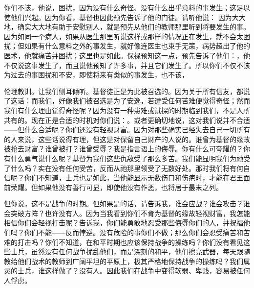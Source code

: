 你们不该，他说，困扰，因为没有什么奇怪、没有什么出乎意料的事发生；这足以使他们兴起。因为你看，基督也因此预先告诉了他的门徒。请听他说： 因为大大地，确实大大地有助于安慰别人，就是预先从他们的教师那里听到将要发生的事。因为如同一个病人，如果从医生那里听说这样或那样的情况正在发生，就不会太困扰；但如果有什么意料之外的事发生，就好像连医生也束手无策，病势超出了他的医术，他就痛苦并困扰；这里也是如此。保禄预知这一点，预先告诉了他们：，他不仅说这事发生了，而且说他预知了许多事，并且它们发生了。所以你们不仅不该为过去的事困扰和不安，即使将来有类似的事发生，也不该，\par

伦理教训。让我们侧耳倾听。基督徒正是为此被召选的。因为关于所有信友，都说了这话：而我们，好像我们被召选是为了安逸，若遭受任何苦难便觉得奇怪；然而我们有什么理由觉得奇怪呢？因为没有一种患难或试探的时期临到我们，不是人所共有的。现在正是合适的时机对你们说：。或者更确切地说，这对我们说并不合适——但什么合适呢？你们还没有轻视财富。因为对那些确实已经失去自己一切所有的人来说，这些话说得有理，但这是对保留自己财产的人说的。谁曾为基督的缘故被抢去财富？谁曾被打？谁曾受辱？我是指言语上的侮辱。你有什么可夸耀的？你有什么勇气说什么呢？基督为我们这些仇敌受了那么多苦。我们能显明我们为祂受了什么吗？实在没有任何受苦，反而从祂那里领受了无数好处。那时我们将有何自信呢？你们不知道，士兵也是如此，当他能显示无数伤口和伤疤时，才能在君王面前荣耀。但如果他没有善行可显，即使他没有作恶，也将居于最末之列。\par

但你说，这不是战争的时期。但如果是的话，请告诉我，谁会应战？谁会攻击？谁会突破方阵？也许没有人。因为当我看到你们不肯为基督的缘故轻视财富，我怎能相信你们会轻视打击呢？告诉我，你们能勇敢地忍受那些侮辱你们的人，并祝福他们吗？你们不能——反而悖逆。没有危险的事你们不做；那么你们会忍受痛苦和苦难的打击吗？你们不知道，在和平时期也应该保持战争的操练吗？你们没有看见这些士兵，虽然没有任何战争扰乱他们，而是深刻的和平，他们擦亮武器，每天跟随教给他们战术的教师到广阔平坦的平原上，极其严格地保持战争的操练吗？我们属灵的士兵，谁这样做了？没有人。因此我们在战争中变得软弱、卑贱，容易被任何人俘虏。\par

